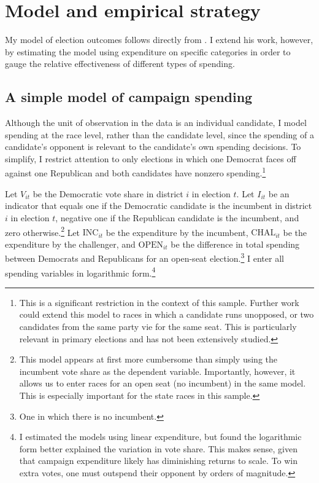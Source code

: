 \documentclass{article}
\begin{document}
\section{Model and empirical strategy}

My model of election outcomes follows directly from \cite{levitt-1994}. I extend his work, however, by estimating the model using expenditure on specific categories in order to gauge the relative effectiveness of different types of spending.

\subsection{A simple model of campaign spending}

Although the unit of observation in the data is an individual candidate, I model spending at the race level, rather than the candidate level, since the spending of a candidate's opponent is relevant to the candidate's own spending decisions. To simplify, I restrict attention to only elections in which one Democrat faces off against one Republican and both candidates have nonzero spending.\footnote{This is a significant restriction in the context of this sample. Further work could extend this model to races in which a candidate runs unopposed, or two candidates from the same party vie for the same seat. This is particularly relevant in primary elections and has not been extensively studied.}

Let $V_{it}$ be the Democratic vote share in district $i$ in election $t$. Let $I_{it}$ be an indicator that equals one if the Democratic candidate is the incumbent in district $i$ in election $t$, negative one if the Republican candidate is the incumbent, and zero otherwise.\footnote{This model appears at first more cumbersome than simply using the incumbent vote share as the dependent variable. Importantly, however, it allows us to enter races for an open seat (no incumbent) in the same model. This is especially important for the state races in this sample.} Let $\text{INC}_{it}$ be the expenditure by the incumbent, $\text{CHAL}_{it}$ be the expenditure by the challenger, and $\text{OPEN}_{it}$ be the difference in total spending between Democrats and Republicans for an open-seat election.\footnote{One in which there is no incumbent.} I enter all spending variables in logarithmic form.\footnote{I estimated the models using linear expenditure, but found the logarithmic form better explained the variation in vote share. This makes sense, given that campaign expenditure likely has diminishing returns to scale. To win extra votes, one must outspend their opponent by orders of magnitude.}
\end{document}
